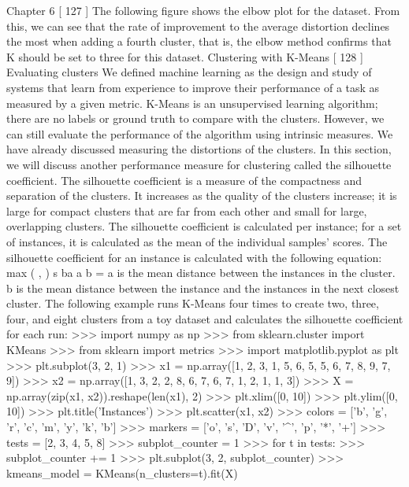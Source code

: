 Chapter 6
[ 127 ]
The following figure shows the elbow plot for the dataset. From this, we can see that
the rate of improvement to the average distortion declines the most when adding a
fourth cluster, that is, the elbow method confirms that K should be set to three for
this dataset.
Clustering with K-Means
[ 128 ]
Evaluating clusters
We defined machine learning as the design and study of systems that learn from
experience to improve their performance of a task as measured by a given metric.
K-Means is an unsupervised learning algorithm; there are no labels or ground truth
to compare with the clusters. However, we can still evaluate the performance of
the algorithm using intrinsic measures. We have already discussed measuring the
distortions of the clusters. In this section, we will discuss another performance measure
for clustering called the silhouette coefficient. The silhouette coefficient is a measure of
the compactness and separation of the clusters. It increases as the quality of the clusters
increase; it is large for compact clusters that are far from each other and small for large,
overlapping clusters. The silhouette coefficient is calculated per instance; for a set of
instances, it is calculated as the mean of the individual samples' scores. The silhouette
coefficient for an instance is calculated with the following equation:
max ( , )
s ba
a b
=
a is the mean distance between the instances in the cluster. b is the mean distance
between the instance and the instances in the next closest cluster. The following
example runs K-Means four times to create two, three, four, and eight clusters
from a toy dataset and calculates the silhouette coefficient for each run:
>>> import numpy as np
>>> from sklearn.cluster import KMeans
>>> from sklearn import metrics
>>> import matplotlib.pyplot as plt
>>> plt.subplot(3, 2, 1)
>>> x1 = np.array([1, 2, 3, 1, 5, 6, 5, 5, 6, 7, 8, 9, 7, 9])
>>> x2 = np.array([1, 3, 2, 2, 8, 6, 7, 6, 7, 1, 2, 1, 1, 3])
>>> X = np.array(zip(x1, x2)).reshape(len(x1), 2)
>>> plt.xlim([0, 10])
>>> plt.ylim([0, 10])
>>> plt.title('Instances')
>>> plt.scatter(x1, x2)
>>> colors = ['b', 'g', 'r', 'c', 'm', 'y', 'k', 'b']
>>> markers = ['o', 's', 'D', 'v', '^', 'p', '*', '+']
>>> tests = [2, 3, 4, 5, 8]
>>> subplot_counter = 1
>>> for t in tests:
>>> subplot_counter += 1
>>> plt.subplot(3, 2, subplot_counter)
>>> kmeans_model = KMeans(n_clusters=t).fit(X)

